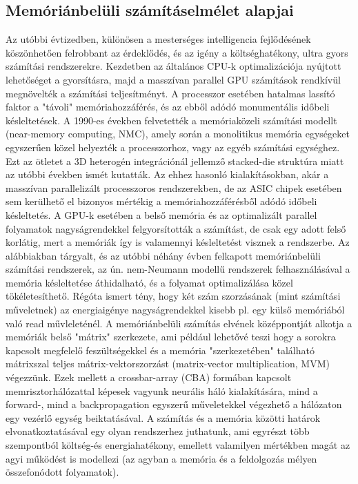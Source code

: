 \documentclass[twoside]{article}
\begin{document}
\subsection{Memóriánbelüli számításelmélet alapjai}
\label{imc}
\par
Az utóbbi évtizedben, különösen a mesterséges intelligencia fejlődésének köszönhetően felrobbant az érdeklődés, és az igény a költséghatékony, ultra gyors számítási rendszerekre. Kezdetben az általános CPU-k optimalizációja nyújtott lehetőséget a gyorsításra, majd a masszívan parallel GPU számítások rendkívül megnövelték a számítási teljesítményt. A processzor esetében hatalmas lassító faktor a "távoli" memóriahozzáférés, és az ebből adódó monumentális időbeli késleltetések. A 1990-es években felvetették a memóriaközeli számítási modellt (near-memory computing, NMC)\cite{sebastian2020memory}\cite{patterson1997}, amely során a monolitikus memória egységeket egyszerűen közel helyezték a processzorhoz, vagy az egyéb számítási egységhez. Ezt az ötletet a 3D heterogén integrációnál jellemző stacked-die struktúra miatt az utóbbi években ismét kutatták\cite{shulaker2017}. Az ehhez hasonló kialakításokban, akár a masszívan parallelizált processzoros rendszerekben, de az ASIC chipek esetében\cite{jouppi2017} sem kerülhető el bizonyos mértékig a memóriahozzáférésből adódó időbeli késleltetés. A GPU-k esetében a belső memória és az optimalizált parallel folyamatok nagyságrendekkel felgyorsították a számítást, de csak egy adott felső korlátig, mert a memóriák így is valamennyi késleltetést visznek a rendszerbe. Az alábbiakban tárgyalt, és az utóbbi néhány évben felkapott memóriánbelüli számítási rendszerek, az ún. nem-Neumann modellű rendszerek felhasználásával a memória késleltetése áthidalható, és a folyamat optimalizálása közel tökéletesíthető. Régóta ismert tény, hogy két szám szorzásának (mint számítási műveletnek) az energiaigénye nagyságrendekkel kisebb pl. egy külső memóriából való read művleleténél\cite{horowitz2014}. A memóriánbelüli számítás elvének középpontját alkotja a memóriák belső "mátrix" szerkezete, ami például lehetővé teszi hogy a sorokra kapcsolt megfelelő feszültségekkel és a memória "szerkezetében" található mátrixszal teljes mátrix-vektorszorzást (matrix-vector multiplication, MVM) végezzünk. Ezek mellett a crossbar-array (CBA) formában kapcsolt memrisztorhálózattal képesek vagyunk neurális háló kialakítására, mind a forward-, mind a backpropagation egyszerű műveletekkel végezhető a hálózaton egy vezérlő egység beiktatásával. A számítás és a memória közötti határok elvonatkoztatásával egy olyan rendszerhez juthatunk, ami egyrészt több szempontból költség-és energiahatékony, emellett valamilyen mértékben magát az agyi működést is modellezi (az agyban a memória és a feldolgozás mélyen összefonódott folyamatok\cite{indiveri2015}).\par\smallskip
\end{document}
